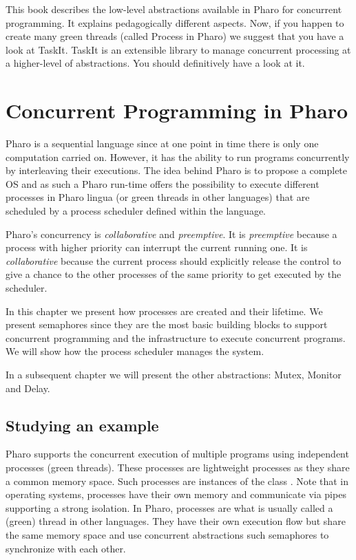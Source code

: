 \documentclass[10pt,twoside,english]{_support/latex/sbabook/sbabook}
\begin{document}
\frontmatter
\pagestyle{plain}

\tableofcontents*
\clearpage\listoffigures

\mainmatter


This book describes the low-level abstractions available in Pharo for concurrent programming. 
It explains pedagogically different aspects. 
Now, if you happen to create many green threads (called Process in Pharo) we suggest that you 
have a look at TaskIt. TaskIt is an extensible library to manage concurrent processing at a higher-level of abstractions. 
You should definitively have a look at it. 
\chapter{Concurrent Programming in Pharo}
Pharo is a sequential language since at one point in time there is only one computation carried on. However, it has the ability to run programs concurrently by interleaving their executions. The idea behind Pharo is to propose a complete OS and as such a Pharo run-time offers the possibility to execute different processes in Pharo lingua (or green threads in other languages) that are scheduled by a process scheduler defined within the language.

Pharo's concurrency is \textit{collaborative} and \textit{preemptive}. It is \textit{preemptive} because a process with higher priority can interrupt the current running one. It is \textit{collaborative} because the current process should explicitly release the control to give a chance to the other processes of the same priority to get executed by the scheduler.

In this chapter we present how processes are created and their lifetime. We present
semaphores since they are the most basic building blocks to support concurrent programming and the infrastructure to execute concurrent programs. We will show how the process scheduler manages the system. 

In a subsequent chapter we will present the other abstractions: Mutex, Monitor and Delay.
\section{Studying an example}
Pharo supports the concurrent execution of multiple programs using independent processes (green threads). 
These processes are lightweight processes as they share a common memory space. 
Such processes are instances of the class . 
Note that in operating systems, processes have their own memory and communicate via pipes supporting a strong isolation. 
In Pharo, processes are what is usually called a (green) thread in other languages. 
They have their own execution flow but share the same memory space and use concurrent abstractions such semaphores to synchronize with each other.
\end{document}
